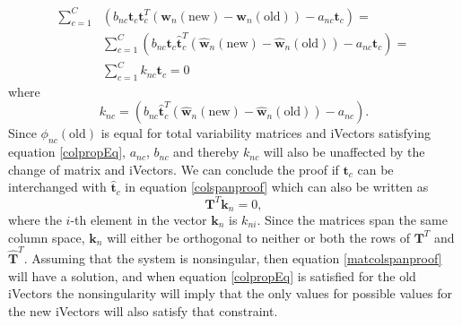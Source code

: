 \begin{align}
\sum_{c=1}^C & \left( b_{nc} \mathbf{t}_c \mathbf{t}_c^T(\mathbf{w}_n(\text{new})-\mathbf{w}_n(\text{old})) - a_{nc} \mathbf{t}_c \right) =  \nonumber \\
& \sum_{c=1}^C \left( b_{nc} \mathbf{t}_c \mathbf{\hat{t}}_c^T(\mathbf{\hat{w}}_n(\text{new})-\mathbf{\hat{w}}_n(\text{old})) - a_{nc} \mathbf{t}_c \right) = \nonumber \\
& \sum_{c=1}^C k_{nc} \mathbf{t}_c = 0 \label{colspanproof}
\end{align}
where
\begin{equation*}
k_{nc} = \left(b_{nc}\mathbf{\hat{t}}_c^T(\mathbf{\hat{w}}_n(\text{new})-\mathbf{\hat{w}}_n(\text{old})) - a_{nc}\right).
\end{equation*}
Since $\phi_{nc}(\text{old})$ is equal for total variability matrices and iVectors satisfying equation \ref{colpropEq}, $a_{nc}$, $b_{nc}$ and thereby $k_{nc}$ will also be unaffected by the change of matrix and iVectors. We can conclude the proof if $\mathbf{t}_c$ can be interchanged with $\mathbf{\hat{t}}_c$ in equation \ref{colspanproof} which can also be written as
\begin{equation}
\label{matcolspanproof}
\mathbf{T}^T \mathbf{k}_n = 0,
\end{equation}
where the $i$-th element in the vector $\mathbf{k}_n$ is $k_{ni}$. Since the matrices span the same column space, $\mathbf{k}_n$ will either be orthogonal to neither or both the rows of  $\mathbf{T}^T$ and $\mathbf{\hat{T}}^T$. Assuming that the system is nonsingular, then equation \ref{matcolspanproof} will have a solution, and when equation \ref{colpropEq} is satisfied for the old iVectors the nonsingularity will imply that the only values for possible values for the new iVectors will also satisfy that constraint.

